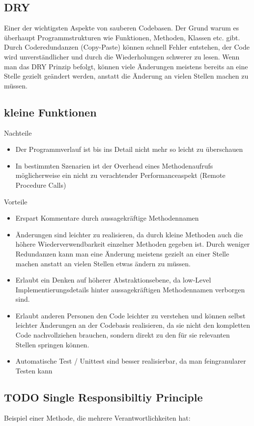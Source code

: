 \documentclass[a4paper,12pt,oneside]{book}
\begin{document}
\subsection{DRY}
\label{sec-1-3-1}
Einer der wichtigsten Aspekte von sauberen Codebasen. Der Grund warum es
überhaupt Programmstrukturen wie Funktionen, Methoden, Klassen etc. gibt.
Durch Coderedundanzen (Copy-Paste) können schnell Fehler entstehen, der Code
wird unverständlicher und durch die Wiederholungen schwerer zu lesen.
Wenn man das DRY Prinzip befolgt, können viele Änderungen meistens bereits an
eine Stelle gezielt geändert werden, anstatt die Änderung an vielen Stellen
machen zu müssen.

\subsection{kleine Funktionen}
\label{sec-1-3-2}
Nachteile
\begin{itemize}
\item Der Programmverlauf ist bis ins Detail nicht mehr so leicht zu überschauen
\item In bestimmten Szenarien ist der Overhead eines Methodenaufrufs möglicherweise
ein nicht zu verachtender Performanceaspekt (Remote Procedure Calls)
\end{itemize}
Vorteile
\begin{itemize}
\item Erspart Kommentare durch aussagekräftige Methodennamen
\item Änderungen sind leichter zu realisieren, da durch kleine Methoden auch die
höhere Wiederverwendbarkeit einzelner Methoden gegeben ist. Durch weniger Redundanzen kann man
eine Änderung meistens gezielt an einer Stelle machen anstatt an vielen
Stellen etwas ändern zu müssen.
\item Erlaubt ein Denken auf höherer Abstraktionsebene, da low-Level
Implementierungsdetails hinter aussagekräftigen Methodennamen verborgen sind.
\item Erlaubt anderen Personen den Code leichter zu verstehen und  können selbst
leichter Änderungen an der Codebasis realisieren, da sie nicht den kompletten
Code nachvollziehen brauchen, sondern direkt zu den für sie relevanten Stellen
springen können.
\item Automatische Test / Unittest sind besser realisierbar, da man feingranularer
Testen kann
\end{itemize}

\subsection{{\bfseries\sffamily TODO} Single Responsibiltiy Principle}
\label{sec-1-3-3}
Beispiel einer Methode, die mehrere Verantwortlichkeiten hat:
\end{document}
